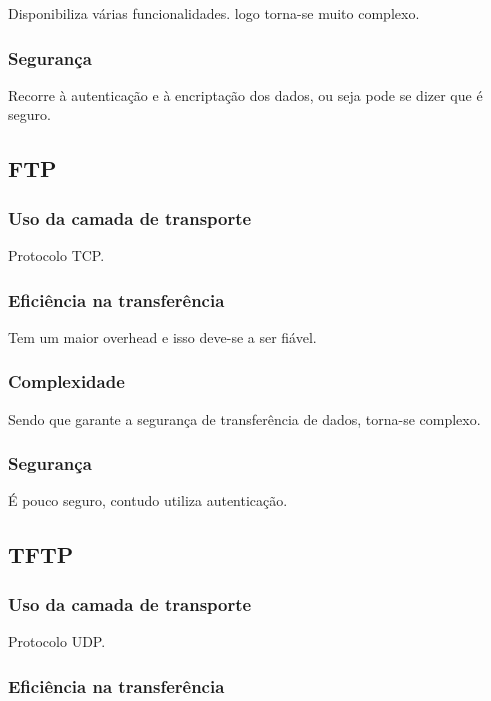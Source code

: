 \documentclass[a4paper]{report}
\begin{document}
Disponibiliza várias funcionalidades. logo torna-se muito complexo.

\subsubsection{Segurança}

Recorre à autenticação e à encriptação dos dados, ou seja pode se dizer que é seguro.

\subsection{FTP}

\subsubsection{Uso da camada de transporte}

Protocolo TCP.

\subsubsection{Eficiência na transferência}

Tem um maior overhead e isso deve-se a ser fiável.

\subsubsection{Complexidade}

Sendo que garante a segurança de transferência de dados, torna-se complexo.

\subsubsection{Segurança}

É pouco seguro, contudo utiliza autenticação.

\subsection{TFTP}

\subsubsection{Uso da camada de transporte}

Protocolo UDP.

\subsubsection{Eficiência na transferência}
\end{document}
